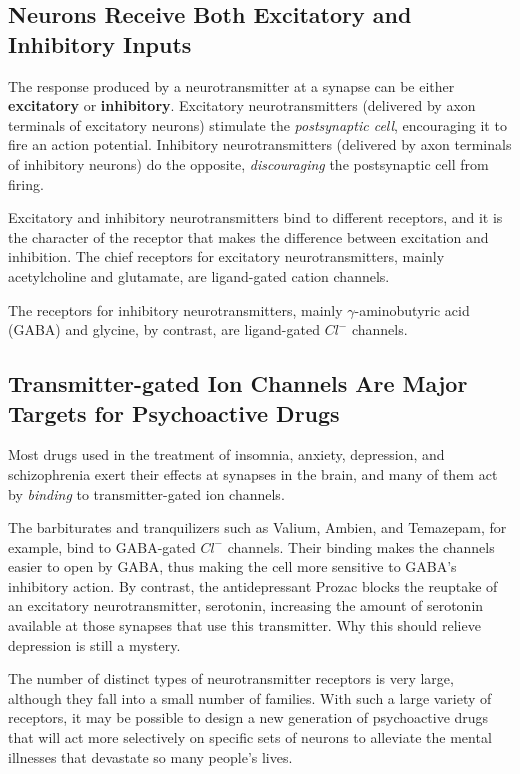\subsection{Neurons Receive Both Excitatory and Inhibitory Inputs}

The response produced by a neurotransmitter at a synapse can be either
\textbf{excitatory} or \textbf{inhibitory}. Excitatory neurotransmitters (delivered by axon
terminals of excitatory neurons) stimulate the \textit{postsynaptic cell}, encouraging
it to fire an action potential. Inhibitory neurotransmitters (delivered
by axon terminals of inhibitory neurons) do the opposite, \textit{discouraging}
the postsynaptic cell from firing.

Excitatory and inhibitory neurotransmitters bind to different receptors,
and it is the character of the receptor that makes the difference between
excitation and inhibition. The chief receptors for excitatory neurotransmitters,
mainly acetylcholine and glutamate, are ligand-gated cation
channels.

The receptors for inhibitory neurotransmitters, mainly $\gamma$-aminobutyric acid (GABA)
and glycine, by contrast, are ligand-gated $Cl^{-}$ channels.

\subsection{Transmitter-gated Ion Channels Are Major Targets for Psychoactive Drugs}

Most drugs used in the treatment of insomnia, anxiety, depression, and
schizophrenia exert their effects at synapses in the brain, and many of
them act by \textit{binding} to transmitter-gated ion channels. 

The barbiturates and tranquilizers such as Valium, Ambien, and Temazepam, for example,
bind to GABA-gated $Cl^{-}$ channels. Their binding makes the channels easier
to open by GABA, thus making the cell more sensitive to GABA’s inhibitory
action. By contrast, the antidepressant Prozac blocks the reuptake
of an excitatory neurotransmitter, serotonin, increasing the amount of
serotonin available at those synapses that use this transmitter. Why this
should relieve depression is still a mystery.

The number of distinct types of neurotransmitter receptors is very large,
although they fall into a small number of families. With such a large variety of receptors, it
may be possible to design a new generation of psychoactive drugs that
will act more selectively on specific sets of neurons to alleviate the mental
illnesses that devastate so many people’s lives.


